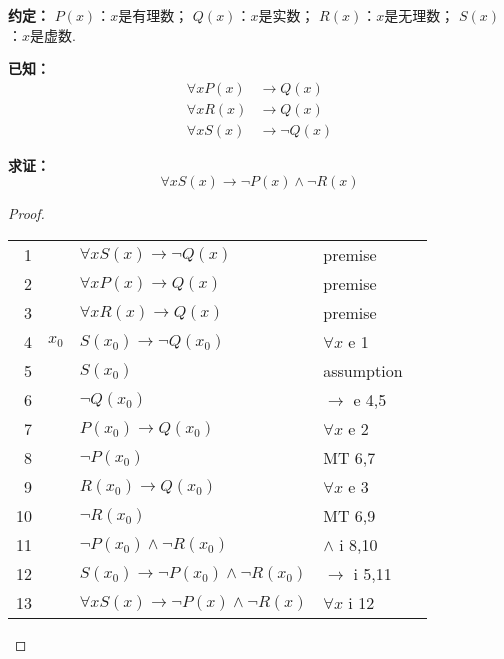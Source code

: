\begin{solution}
    \textbf{约定：}
    $P(x)$：$x$是有理数；
    $Q(x)$：$x$是实数；
    $R(x)$：$x$是无理数；
    $S(x)$：$x$是虚数.

    \textbf{已知：}
    \begin{align*}
        \forall x P(x) &\rightarrow Q(x)\\
        \forall x R(x) &\rightarrow Q(x)\\
        \forall x S(x) &\rightarrow \neg Q(x)
    \end{align*}

    \textbf{求证：}
    $$\forall x S(x) \rightarrow \neg P(x) \wedge \neg R(x)$$

    \begin{proof}~\\

        \centering
        \begin{tabular}{rclll}
            1& &$\forall x S(x) \rightarrow \neg Q(x)$& premise\\
            2& &$\forall x P(x) \rightarrow Q(x)$& premise\\
            3& &$\forall x R(x) \rightarrow Q(x)$& premise&\\\cline{2-5}
            4&\multicolumn{1}{|c}{$x_0$}&$S(x_0) \rightarrow \neg Q(x_0)$ &$\forall x$ e 1&\multicolumn{1}{c|}{}\\\cline{3-4}
            5&\multicolumn{1}{|c|}{} &$S(x_0)$& assumption&\multicolumn{1}{|c|}{}\\
            6&\multicolumn{1}{|c|}{} &$\neg Q(x_0)$ &$\rightarrow$ e 4,5&\multicolumn{1}{|c|}{}\\
            7&\multicolumn{1}{|c|}{} &$P(x_0) \rightarrow Q(x_0)$ &$\forall x$ e 2&\multicolumn{1}{|c|}{}\\
            8&\multicolumn{1}{|c|}{} &$\neg P(x_0)$ &MT 6,7&\multicolumn{1}{|c|}{}\\
            9&\multicolumn{1}{|c|}{} &$R(x_0) \rightarrow Q(x_0)$ &$\forall x$ e 3&\multicolumn{1}{|c|}{}\\
           10&\multicolumn{1}{|c|}{} &$\neg R(x_0)$ &MT 6,9&\multicolumn{1}{|c|}{}\\
           11&\multicolumn{1}{|c|}{} &$\neg P(x_0)\wedge\neg R(x_0)$ &$\wedge$ i 8,10&\multicolumn{1}{|c|}{}\\\cline{3-4}
           12&\multicolumn{1}{|c}{}  &$S(x_0) \rightarrow \neg P(x_0)\wedge\neg R(x_0)$ &$\rightarrow$ i 5,11&\multicolumn{1}{c|}{}\\\cline{2-5}
           13& &$\forall x S(x) \rightarrow \neg P(x) \wedge \neg R(x)$ &$\forall x$ i 12\\
        \end{tabular}

    \end{proof}

\end{solution}
